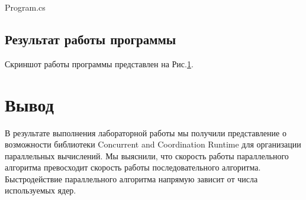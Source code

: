 \documentclass[russian,utf8,pointsection]{eskdtext}
\begin{document}
  
   {Program.cs}
       	
       	\subsection{Результат работы программы}
       	Скриншот работы программы представлен на Рис.\ref{ris:1_2}.
       	\begin{figure}[!h]
       		\caption{}
       		\label{ris:1_2}
       	\end{figure}
       	
	\section{Вывод}
	В результате выполнения лабораторной работы мы получили представление о возможности библиотеки Concurrent and Coordination Runtime для организации параллельных вычислений.
	Мы выяснили, что скорость работы параллельного алгоритма превосходит скорость работы последовательного алгоритма. Быстродействие параллельного алгоритма напрямую зависит от числа используемых ядер.
		
\end{document}

